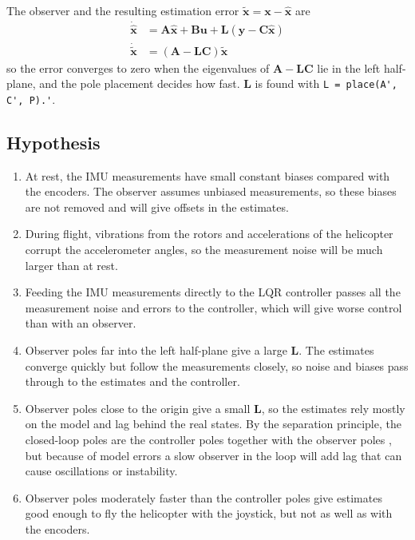 The observer and the resulting estimation error \(\tilde{\mathbf{x}}=\mathbf{x}-\hat{\mathbf{x}}\) are
\begin{subequations}
    \begin{align}
        \dot{\hat{\mathbf{x}}} & =\mathbf{A}\hat{\mathbf{x}}+\mathbf{B}\mathbf{u}+\mathbf{L}(\mathbf{y}-\mathbf{C}\hat{\mathbf{x}}) \label{eq:4_1_State_Estimator} \\
        \dot{\tilde{\mathbf{x}}} & =(\mathbf{A}-\mathbf{L}\mathbf{C})\tilde{\mathbf{x}} \label{eq:4_1_Estimation_Error}
    \end{align}
\end{subequations}
so the error converges to zero when the eigenvalues of \(\mathbf{A}-\mathbf{L}\mathbf{C}\) lie in the left half-plane, and the pole placement decides how fast.
\(\mathbf{L}\) is found with \verb|L = place(A', C', P).'|.

\subsection{Hypothesis}

\begin{enumerate}[label=\textbf{H\arabic*}, leftmargin=*]
    \item \label{hyp:3_bias} At rest, the IMU measurements have small constant biases compared with the encoders. The observer assumes unbiased measurements, so these biases are not removed and will give offsets in the estimates.
    \item \label{hyp:3_accel} During flight, vibrations from the rotors and accelerations of the helicopter corrupt the accelerometer angles, so the measurement noise will be much larger than at rest.
    \item \label{hyp:3_noobs} Feeding the IMU measurements directly to the LQR controller passes all the measurement noise and errors to the controller, which will give worse control than with an observer.
    \item \label{hyp:3_fast} Observer poles far into the left half-plane give a large \(\mathbf{L}\). The estimates converge quickly but follow the measurements closely, so noise and biases pass through to the estimates and the controller.
    \item \label{hyp:3_slow} Observer poles close to the origin give a small \(\mathbf{L}\), so the estimates rely mostly on the model and lag behind the real states.
    By the separation principle, the closed-loop poles are the controller poles together with the observer poles \cite{chen_linear_system}, but because of model errors a slow observer in the loop will add lag that can cause oscillations or instability.
    \item \label{hyp:3_good} Observer poles moderately faster than the controller poles give estimates good enough to fly the helicopter with the joystick, but not as well as with the encoders.
\end{enumerate}

